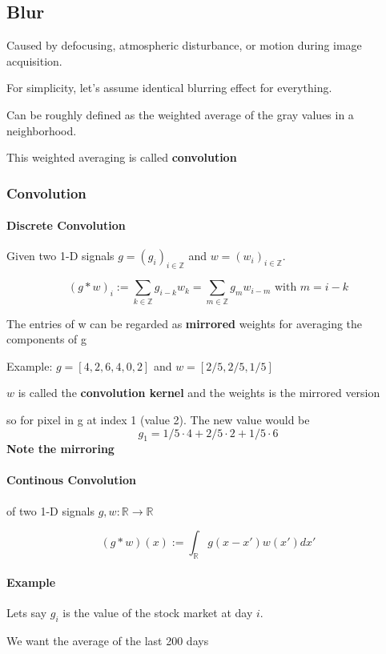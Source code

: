 \documentclass{article}
\begin{document}
\subsection{Blur}
Caused by defocusing, atmospheric disturbance, or motion during image acquisition.

For simplicity, let's assume identical blurring effect for everything.

Can be roughly defined as the weighted average of the gray values in a neighborhood.

This weighted averaging is called \textbf{convolution}

\subsubsection{Convolution}

\paragraph{Discrete Convolution} Given two 1-D signals $g = (g_i)_{i\in\mathbb{Z}}$ and $w = (w_i)_{i\in\mathbb{Z}}$. 

\[(g \ast w)_i := \sum_{k\in\mathbb{Z}}g_{i-k}w_k = \sum_{m\in\mathbb{Z}}g_m w_{i-m}\text{ with } m=i-k\]

The entries of w can be regarded as \textbf{mirrored} weights for averaging the components of g

Example: $g = [4,2,6,4,0,2]$ and $w = [2/5,2/5,1/5]$

$w$ is called the \textbf{convolution kernel} and the weights is the mirrored version

so for pixel in g at index 1 (value 2). The new value would be
\[g_1 = 1/5\cdot 4 + 2/5\cdot 2 + 1/5 \cdot 6\]
\textbf{Note the mirroring}

\paragraph{Continous Convolution} of two 1-D signals $g,w: \mathbb{R} \to \mathbb{R}$

\[(g\ast w)(x) := \int_{\mathbb{R}}g(x-x')w(x')dx'\]

\paragraph{Example} Lets say $g_i$ is the value of the stock market at day $i$.

We want the average of the last 200 days
\end{document}
